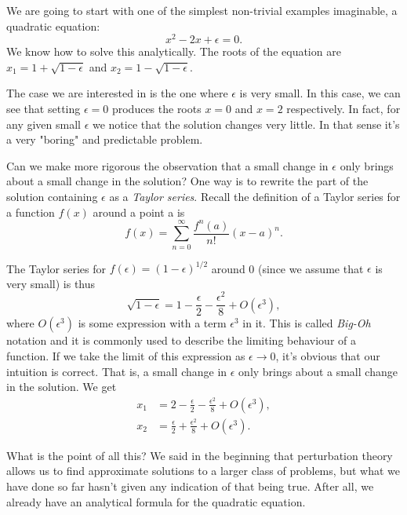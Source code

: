\documentclass[12pt]{article}
\begin{document}
We are going to start with one of the simplest non-trivial examples
imaginable, a quadratic equation:
\begin{equation}
x^2 - 2x + \epsilon = 0.
\end{equation}
We know how to solve this analytically. The roots of the equation are\\
$x_1 = 1 + \sqrt{1 - \epsilon}$ and $x_2 = 1 - \sqrt{1 - \epsilon}$.

The case we are interested in is the one where $\epsilon$ is very
small. In this case, we can see that setting $\epsilon=0$ produces the
roots $x=0$ and $x=2$ respectively. In fact, for any given small
$\epsilon$ we notice that the solution changes very little. In that
sense it's a very "boring" and predictable problem.

Can we make more rigorous the observation that a small change in
$\epsilon$ only brings about a small change in the solution? One way
is to rewrite the part of the solution containing $\epsilon$ as a
\textit{Taylor series}. Recall the definition of a Taylor series for a
function $f(x)$ around a point a is
\begin{equation}
f(x) = \sum_{n=0}^{\infty} \frac{f^{n}(a)}{n!} (x-a)^n.
\end{equation}

The Taylor series for $f(\epsilon) = (1 - \epsilon)^{1/2}$ around 0
(since we assume that $\epsilon$ is very small) is thus
\begin{equation}
\sqrt{1 - \epsilon} = 1 - \frac{\epsilon}{2} - \frac{\epsilon^2}{8} + O(\epsilon^3),
\end{equation}
where $O(\epsilon^3)$ is some expression with a term $\epsilon^3$ in
it. This is called \textit{Big-Oh} notation and it is commonly used to
describe the limiting behaviour of a function. If we take the limit of
this expression as $\epsilon \to 0$, it's obvious that our intuition
is correct. That is, a small change in $\epsilon$ only brings about a
small change in the solution. We get
\begin{align}
x_1 &= 2 - \frac{\epsilon}{2} - \frac{\epsilon^2}{8} + O(\epsilon^3), \\
x_2 &= \frac{\epsilon}{2} + \frac{\epsilon^2}{8} + O(\epsilon^3).
\end{align}

What is the point of all this? We said in the beginning that
perturbation theory allows us to find approximate solutions to a
larger class of problems, but what we have done so far hasn't given
any indication of that being true. After all, we already have an
analytical formula for the quadratic equation.
\end{document}
